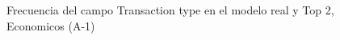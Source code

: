 \begin{figure}[H]
    \centering
    
    \caption{Frecuencia del campo Transaction type en el modelo real y Top 2, Economicos (A-1)}
    \label{frecuency-Transaction Type-top2}
\end{figure}